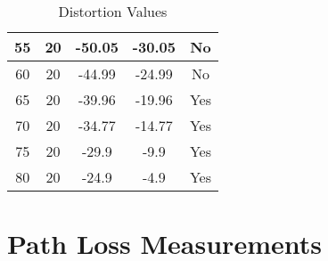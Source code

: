 \begin{table}[H]
\begin{tabular}{|c|c|c|c|c|}
\multicolumn{1}{|c|}{55}                                         & \multicolumn{1}{c|}{20}                                    & \multicolumn{1}{c|}{-50.05}                                         & \multicolumn{1}{c|}{-30.05}                                       & \multicolumn{1}{c|}{No}                                       \\ \hline
\multicolumn{1}{|c|}{60}                                         & \multicolumn{1}{c|}{20}                                    & \multicolumn{1}{c|}{-44.99}                                         & \multicolumn{1}{c|}{-24.99}                                       & \multicolumn{1}{c|}{No}                                       \\ \hline
\multicolumn{1}{|c|}{65}                                         & \multicolumn{1}{c|}{20}                                    & \multicolumn{1}{c|}{-39.96}                                         & \multicolumn{1}{c|}{-19.96}                                       & \multicolumn{1}{c|}{Yes}                                      \\ \hline
\multicolumn{1}{|c|}{70}                                         & \multicolumn{1}{c|}{20}                                    & \multicolumn{1}{c|}{-34.77}                                         & \multicolumn{1}{c|}{-14.77}                                       & \multicolumn{1}{c|}{Yes}                                      \\ \hline
\multicolumn{1}{|c|}{75}                                         & \multicolumn{1}{c|}{20}                                    & \multicolumn{1}{c|}{-29.9}                                          & \multicolumn{1}{c|}{-9.9}                                         & \multicolumn{1}{c|}{Yes}                                      \\ \hline
\multicolumn{1}{|c|}{80}                                         & \multicolumn{1}{c|}{20}                                    & \multicolumn{1}{c|}{-24.9}                                          & \multicolumn{1}{c|}{-4.9}                                         & \multicolumn{1}{c|}{Yes}                                      \\ \hline
\end{tabular}
\caption{Distortion Values}
\label{tab:my-table}
\end{table}

\section{Path Loss Measurements}\label{PathLossMeasurements}

